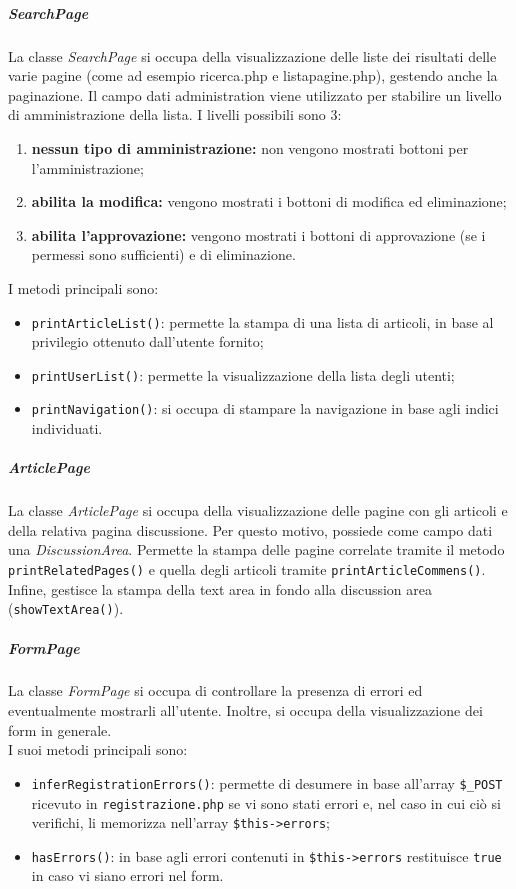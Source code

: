 \subparagraph{SearchPage}
La classe \textit{SearchPage} si occupa della visualizzazione delle liste dei risultati delle varie pagine (come ad esempio ricerca.php e listapagine.php), gestendo anche la paginazione. Il campo dati administration viene utilizzato per stabilire un livello di amministrazione della lista. I livelli possibili sono 3:
\begin{enumerate}[start=0, label=\textbf{\arabic*$\rightarrow$}]
	\item \textbf{nessun tipo di amministrazione:} non vengono mostrati bottoni per l'amministrazione;
	\item \textbf{abilita la modifica:} vengono mostrati i bottoni di modifica ed eliminazione;
	\item \textbf{abilita l'approvazione:} vengono mostrati i bottoni di approvazione (se i permessi sono sufficienti) e di eliminazione.
\end{enumerate}
I metodi principali sono:
\begin{itemize}
	\item \texttt{printArticleList()}: permette la stampa di una lista di articoli, in base al privilegio ottenuto dall'utente fornito;
	\item \texttt{printUserList()}: permette la visualizzazione della lista degli utenti;
	\item \texttt{printNavigation()}: si occupa di stampare la navigazione in base agli indici individuati.
\end{itemize}

\subparagraph{ArticlePage}
La classe \textit{ArticlePage} si occupa della visualizzazione delle pagine con gli articoli e della relativa pagina discussione. Per questo motivo, possiede come campo dati una \textit{DiscussionArea}. Permette la stampa delle pagine correlate tramite il metodo \texttt{printRelatedPages()} e quella degli articoli tramite \texttt{printArticleCommens()}. Infine, gestisce la stampa della text area in fondo alla discussion area (\texttt{showTextArea()}).

\subparagraph{FormPage}
La classe \textit{FormPage} si occupa di controllare la presenza di errori ed eventualmente mostrarli all'utente. Inoltre, si occupa della visualizzazione dei form in generale.\\
I suoi metodi principali sono:
\begin{itemize}
	\item \texttt{inferRegistrationErrors()}: permette di desumere in base all'array \texttt{\$\_POST} ricevuto in \texttt{registrazione.php} se vi sono stati errori e, nel caso in cui ciò si verifichi, li memorizza nell'array \texttt{\$this->errors};
	\item \texttt{hasErrors()}: in base agli errori contenuti in \texttt{\$this->errors} restituisce \texttt{true} in caso vi siano errori nel form. 
\end{itemize}

